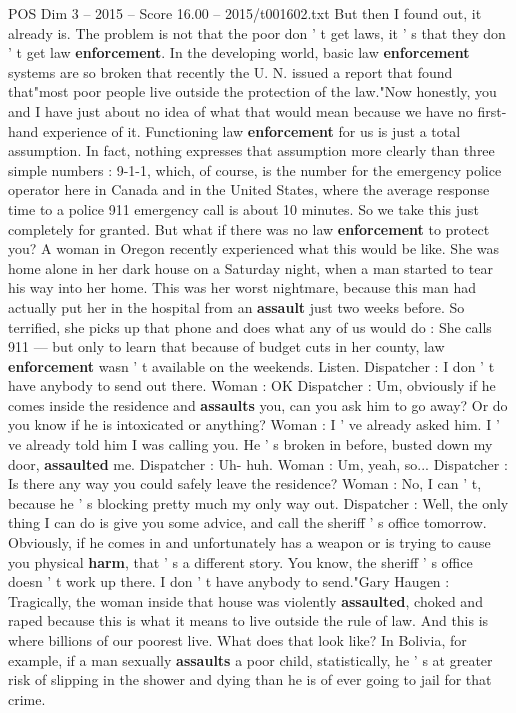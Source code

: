 \begin{textsample}{POS Dim 3 – 2015 – Score 16.00 – 2015/t001602.txt}
But then I found out, it already is.
The problem is not that the poor don ' t get laws, it ' s that they don ' t get law \textbf{enforcement}.
In the developing world, basic law \textbf{enforcement} systems are so broken that recently the U.
N. issued a report that found that"most poor people live outside the protection of the law."Now honestly, you and I have just about no idea of what that would mean because we have no first-hand experience of it.
Functioning law \textbf{enforcement} for us is just a total assumption.
In fact, nothing expresses that assumption more clearly than three simple numbers : 9-1-1, which, of course, is the number for the emergency police operator here in Canada and in the United States, where the average response time to a police 911 emergency call is about 10 minutes.
So we take this just completely for granted.
But what if there was no law \textbf{enforcement} to protect you?
A woman in Oregon recently experienced what this would be like.
She was home alone in her dark house on a Saturday night, when a man started to tear his way into her home.
This was her worst nightmare, because this man had actually put her in the hospital from an \textbf{assault} just two weeks before.
So terrified, she picks up that phone and does what any of us would do : She calls 911 — but only to learn that because of budget cuts in her county, law \textbf{enforcement} wasn ' t available on the weekends.
Listen.
Dispatcher : I don ' t have anybody to send out there.
Woman : OK Dispatcher : Um, obviously if he comes inside the residence and \textbf{assaults} you, can you ask him to go away?
Or do you know if he is intoxicated or anything?
Woman : I ' ve already asked him.
I ' ve already told him I was calling you.
He ' s broken in before, busted down my door, \textbf{assaulted} me.
Dispatcher : Uh- huh.
Woman : Um, yeah, so...
Dispatcher : Is there any way you could safely leave the residence?
Woman : No, I can ' t, because he ' s blocking pretty much my only way out.
Dispatcher : Well, the only thing I can do is give you some advice, and call the sheriff ' s office tomorrow.
Obviously, if he comes in and unfortunately has a weapon or is trying to cause you physical \textbf{harm}, that ' s a different story.
You know, the sheriff ' s office doesn ' t work up there.
I don ' t have anybody to send."Gary Haugen : Tragically, the woman inside that house was violently \textbf{assaulted}, choked and raped because this is what it means to live outside the rule of law.
And this is where billions of our poorest live.
What does that look like?
In Bolivia, for example, if a man sexually \textbf{assaults} a poor child, statistically, he ' s at greater risk of slipping in the shower and dying than he is of ever going to jail for that crime.

\end{textsample}
